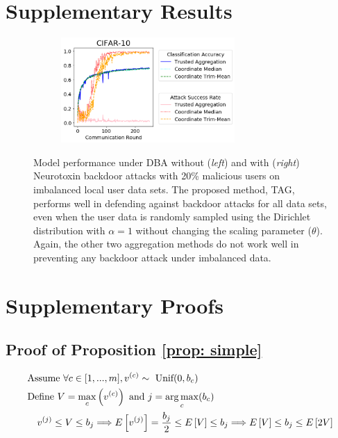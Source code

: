 \documentclass{article} %
\begin{document}
\section{Supplementary Results}


\begin{figure}[htp]
  \begin{subfigure}{.35\textwidth}
  \centering
  \end{subfigure}%
  \begin{subfigure}{.65\textwidth}
  \centering
    \includegraphics[height=4cm, left]{make_article/make_visuals/visuals/accuracy--cifar_10--n_malicious2--dba1--beta0.2--neuro_p0.1--alpha1.png}
  \end{subfigure}%
\caption{\footnotesize Model performance under DBA without (\textit{left}) and with (\textit{right}) Neurotoxin backdoor attacks with 20\% malicious users on imbalanced local user data sets. The proposed method, TAG, performs well in defending against backdoor attacks for all data sets, even when the user data is randomly sampled using the Dirichlet distribution with $\alpha = 1$ without changing the scaling parameter ($\theta$). Again, the other two aggregation methods do not work well in preventing any backdoor attack under imbalanced data.}
\label{fig: accuracy--n_malicious2--alpha1}

\end{figure}


\section{Supplementary Proofs}
\subsection{Proof of Proposition \ref{prop: simple}}
\label{app: simple}
\begin{align*}
    & \textrm{Assume } \forall c \in [1,...,m], v^{(c)} \sim \textrm{ Unif}(0, b_c) \\
    & \textrm{Define } V = \max_c \left( v^{(c)} \right) \textrm{ and } j = \operatorname*{arg\,max}_c (b_c) \\
    & \quad v^{(j)} \leq V \leq b_j \Longrightarrow E \left[ v^{(j)} \right] = \dfrac{b_j}{2} \leq E \left[ V \right] \leq b_j  \Longrightarrow E \left[ V \right] \leq b_j \leq E \left[ 2 V \right]
\end{align*}
\end{document}
